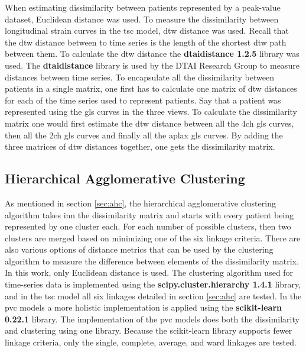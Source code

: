 When estimating dissimilarity between patients represented by a peak-value dataset, Euclidean distance was used. To measure the dissimilarity between longitudinal strain curves in the \acrshort{tsc} model, \acrshort{dtw} distance was used. Recall that the \acrshort{dtw} distance between to time series is the length of the shortest \acrshort{dtw} path between them. To calculate the \acrshort{dtw} distance the \textbf{dtaidistance 1.2.5} library was used. The \textbf{dtaidistance} library is used by the DTAI Research Group to measure distances between time series. To encapsulate all the dissimilarity between patients in a single matrix, one first has to calculate one matrix of \acrshort{dtw} distances for each of the time series used to represent patients. Say that a patient was represented using the \acrshort{gls} curves in the three views. To calculate the dissimilarity matrix one would first estimate the \acrshort{dtw} distance between all the \acrshort{4ch} \acrshort{gls} curves, then all the \acrshort{2ch} \acrshort{gls} curves and finally all the \acrshort{aplax} \acrshort{gls} curves. By adding the three matrices of \acrshort{dtw} distances together, one gets the dissimilarity matrix. \bigskip

\subsection{Hierarchical Agglomerative Clustering}

As mentioned in section \ref{sec:ahc}, the hierarchical agglomerative clustering algorithm takes inn the dissimilarity matrix and starts with every patient being represented by one cluster each. For each number of possible clusters, then two clusters are merged based on minimizing one of the six linkage criteria. There are also various options of distance metrics that can be used by the clustering algorithm to measure the difference between elements of the dissimilarity matrix. In this work, only Euclidean distance is used. The clustering algorithm used for time-series data is implemented using the \textbf{scipy.cluster.hierarchy 1.4.1} library, and in the \acrshort{tsc} model all six linkages detailed in section \ref{sec:ahc} are tested. In the \acrshort{pvc} models a more holistic implementation is applied using the \textbf{scikit-learn 0.22.1} library. The implementation of the \acrshort{pvc} models does both the dissimilarity and clustering using one library. Because the scikit-learn library supports fewer linkage criteria, only the single, complete, average, and ward linkages are tested. 


